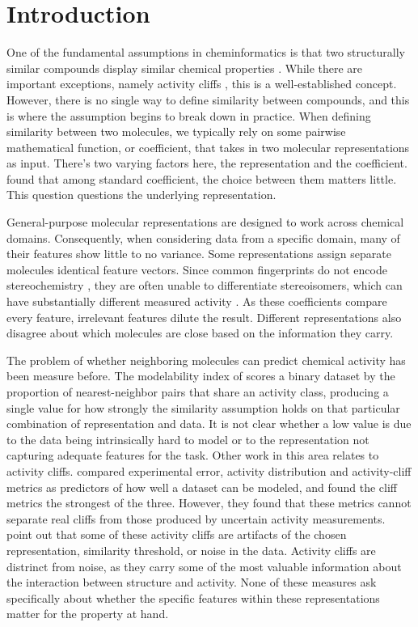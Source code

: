 \section{Introduction}

One of the fundamental assumptions in cheminformatics is that two structurally similar compounds display similar chemical properties \citep{Johnson1990}. While there are important exceptions, namely activity cliffs \citep{Stumpfe2012, vanTilborg2022}, this is a well-established concept. However, there is no single way to define similarity between compounds, and this is where the assumption begins to break down in practice. When defining similarity between two molecules, we typically rely on some pairwise mathematical function, or coefficient, that takes in two molecular representations as input. There's two varying factors here, the representation and the coefficient. \citet{Bajusz2015} found that among standard coefficient, the choice between them matters little. This question questions the underlying representation. 

General-purpose molecular representations are designed to work across chemical domains. Consequently, when considering data from a specific domain, many of their features show little to no variance. Some representations assign separate molecules identical feature vectors. Since common fingerprints do not encode stereochemistry \citep{orsi2024map4c}, they are often unable to differentiate stereoisomers, which can have substantially different measured activity \citep{Nguyen2006}. As these coefficients compare every feature, irrelevant features dilute the result. Different representations also disagree about which molecules are close based on the information they carry. 


The problem of whether neighboring molecules can predict chemical activity has been measure before. The modelability index of \citet{Golbraikh2014} scores a binary dataset by the proportion of nearest-neighbor pairs that share an activity class, producing a single value for how strongly the similarity assumption holds on that particular combination of representation and data. It is not clear whether a low value is due to the data being intrinsically hard to model or to the representation not capturing adequate features for the task. Other work in this area relates to activity cliffs. \citet{Sheridan2020} compared experimental error, activity distribution and activity-cliff metrics as predictors of how well a dataset can be modeled, and found the cliff metrics the strongest of the three. However, they found that these metrics cannot separate real cliffs from  those produced by uncertain activity measurements. \citet{MedinaFranco2013} point out that some of these activity cliffs are artifacts of the chosen representation, similarity threshold, or noise in the data. Activity cliffs are distrinct from noise, as they carry some of the most valuable information about the interaction between structure and activity. None of these measures ask specifically about whether the specific features within these representations matter for the property at hand. 


